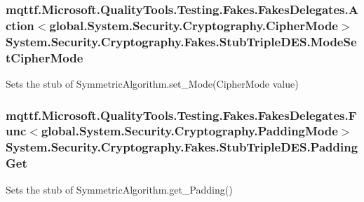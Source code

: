 \hypertarget{class_system_1_1_security_1_1_cryptography_1_1_fakes_1_1_stub_triple_d_e_s_a83fac0d9730194dfa440b8166dd967ba}{
\subsubsection[{Mode\-Set\-Cipher\-Mode}]{\setlength{\rightskip}{0pt plus 5cm}mqttf.\-Microsoft.\-Quality\-Tools.\-Testing.\-Fakes.\-Fakes\-Delegates.\-Action$<$global.\-System.\-Security.\-Cryptography.\-Cipher\-Mode$>$ System.\-Security.\-Cryptography.\-Fakes.\-Stub\-Triple\-D\-E\-S.\-Mode\-Set\-Cipher\-Mode}}\label{class_system_1_1_security_1_1_cryptography_1_1_fakes_1_1_stub_triple_d_e_s_a83fac0d9730194dfa440b8166dd967ba}


Sets the stub of Symmetric\-Algorithm.\-set\-\_\-\-Mode(\-Cipher\-Mode value)

\hypertarget{class_system_1_1_security_1_1_cryptography_1_1_fakes_1_1_stub_triple_d_e_s_ababcca1c9d34c341dc90b1f7d78b5a05}{
\subsubsection[{Padding\-Get}]{\setlength{\rightskip}{0pt plus 5cm}mqttf.\-Microsoft.\-Quality\-Tools.\-Testing.\-Fakes.\-Fakes\-Delegates.\-Func$<$global.\-System.\-Security.\-Cryptography.\-Padding\-Mode$>$ System.\-Security.\-Cryptography.\-Fakes.\-Stub\-Triple\-D\-E\-S.\-Padding\-Get}}\label{class_system_1_1_security_1_1_cryptography_1_1_fakes_1_1_stub_triple_d_e_s_ababcca1c9d34c341dc90b1f7d78b5a05}


Sets the stub of Symmetric\-Algorithm.\-get\-\_\-\-Padding()

